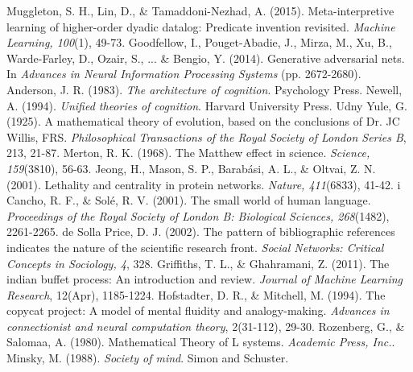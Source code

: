 \documentclass[11pt,letterpaper]{article}
\begin{document}
\begin{thebibliography}{}
    Muggleton, S. H., Lin, D., \& Tamaddoni-Nezhad, A. (2015).
    Meta-interpretive learning of higher-order dyadic datalog: Predicate
    invention revisited.
    \emph{Machine Learning, 100}(1), 49-73.
    Goodfellow, I., Pouget-Abadie, J., Mirza, M., Xu, B., Warde-Farley, D.,
    Ozair, S., ... \& Bengio, Y. (2014).
    Generative adversarial nets.
    In \emph{Advances in Neural Information Processing Systems} (pp.
    2672-2680).
    Anderson, J. R. (1983).
    \emph{The architecture of cognition}. Psychology Press.
    Newell, A. (1994).
    \emph{Unified theories of cognition}. Harvard University Press.
    Udny Yule, G. (1925).
    A mathematical theory of evolution, based on the conclusions of Dr. JC Willis, FRS.
    \emph{Philosophical Transactions of the Royal Society of London Series B}, 213, 21-87.
    Merton, R. K. (1968).
    The Matthew effect in science.
    \emph{Science, 159}(3810), 56-63.
    Jeong, H., Mason, S. P., Barabási, A. L., \& Oltvai, Z. N. (2001).
    Lethality and centrality in protein networks.
    \emph{Nature, 411}(6833), 41-42.
    i Cancho, R. F., \& Solé, R. V. (2001).
    The small world of human language.
    \emph{Proceedings of the Royal Society of London B: Biological Sciences, 268}(1482), 2261-2265.
    de Solla Price, D. J. (2002).
    The pattern of bibliographic references indicates the nature of the scientific research front.
    \emph{Social Networks: Critical Concepts in Sociology, 4}, 328.
    Griffiths, T. L., \& Ghahramani, Z. (2011).
    The indian buffet process: An introduction and review.
    \emph{Journal of Machine Learning Research}, 12(Apr), 1185-1224.
    Hofstadter, D. R., \& Mitchell, M. (1994).
    The copycat project: A model of mental fluidity and analogy-making.
    \emph{Advances in connectionist and neural computation theory}, 2(31-112), 29-30.
    Rozenberg, G., \& Salomaa, A. (1980).
    Mathematical Theory of L systems.
    \emph{Academic Press, Inc.}.
    Minsky, M. (1988).
    \emph{Society of mind}.
    Simon and Schuster.
\end{thebibliography}
\end{document}
